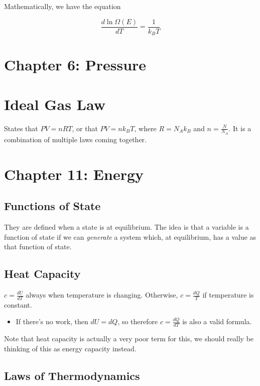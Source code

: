 \documentclass[10pt]{article}
\begin{document}
    Mathematically, we have the equation 

    \[ \frac{d \ln \Omega(E)}{dT} = \frac{1}{k_BT}\]

    \section*{Chapter 6: Pressure} 


    \section*{Ideal Gas Law}

    States that $PV = nRT$, or that $PV = nk_BT$, where $R = N_A k_B$ and $n = \frac{N}{N_A}$. It is a combination of multiple laws coming together. 


    \section*{Chapter 11: Energy}

    \subsection*{Functions of State}

    They are defined when a state is at equilibrium. The idea is that a variable is a function of state if we can \textit{generate} a system which, at equilibrium, has a value as that function of state. 


    \subsection*{Heat Capacity} 

    $c = \frac{dU}{dT}$ always when temperature is changing. Otherwise, $c = \frac{dQ}{T}$ if temperature is constant.

    \begin{itemize}
        \item If there's no work, then $dU = dQ$, so therefore $c = \frac{dQ}{dT}$ is also a valid formula. 
    \end{itemize}

    Note that heat capacity is actually a very poor term for this, we should really be thinking of this as energy capacity instead. 

    \subsection*{Laws of Thermodynamics}
    
\end{document}
